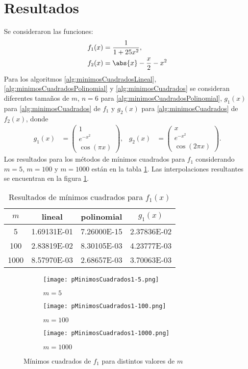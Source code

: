 \section{Resultados}
Se consideraron las funciones:
\begin{align*}
f_1(x)&=\frac{1}{1+25x^2},\\
f_2(x)&=\abs{x}-\frac{x}{2}-x^2
\end{align*}
Para los algoritmos \ref{alg:minimosCuadradosLineal}, \ref{alg:minimosCuadradosPolinomial} y \ref{alg:minimosCuadrados} se consideran diferentes tamaños de $m$, $n=6$ para \ref{alg:minimosCuadradosPolinomial}, $g_1(x)$ para \ref{alg:minimosCuadrados} de $f_1$ y $g_2(x)$ para \ref{alg:minimosCuadrados} de $f_2(x)$, donde
\begin{align*}
g_1(x)&=\begin{pmatrix}
1\\
e^{-x^2}\\
\cos(\pi x)
\end{pmatrix}, &
g_2(x)&=\begin{pmatrix}
x\\
e^{-x^2}\\
\cos(2\pi x)
\end{pmatrix}.
\end{align*}
Los resultados para los métodos de mínimos cuadrados para $f_1$ considerando $m=5$, $m=100$ y $m=1000$ están en la tabla \ref{tab:minimosCuadrados1}. Las interpolaciones resultantes se encuentran en la figura \ref{fig:minimosCuadrados1}.\par
\begin{table}[H]
\centering
\begin{tabular}{|c|c|c|c|}
\hline
$m$  & lineal      & polinomial  & $g_1(x)$    \\ \hline
5    & 1.69131E-01 & 7.26000E-15 & 2.37836E-02 \\ \hline
100  & 2.83819E-02 & 8.30105E-03 & 4.23777E-03 \\ \hline
1000 & 8.57970E-03 & 2.68657E-03 & 3.70063E-03 \\ \hline
\end{tabular}
\caption{Resultados de mínimos cuadrados para $f_1(x)$}
\label{tab:minimosCuadrados1}
\end{table}
\begin{figure}[H]
\centering
\begin{subfigure}[b]{0.3\textwidth}
	\centering
	\texttt{[image: pMinimosCuadrados1-5.png]}
	\caption{$m=5$}
\end{subfigure}
\hfill
\begin{subfigure}[b]{0.3\textwidth}
	\centering
	\texttt{[image: pMinimosCuadrados1-100.png]}
	\caption{$m=100$}
\end{subfigure}
\hfill
\begin{subfigure}[b]{0.3\textwidth}
	\centering
	\texttt{[image: pMinimosCuadrados1-1000.png]}
	\caption{$m=1000$}
\end{subfigure}
\caption{Mínimos cuadrados de $f_1$ para distintos valores de $m$}
\label{fig:minimosCuadrados1}
\end{figure}
